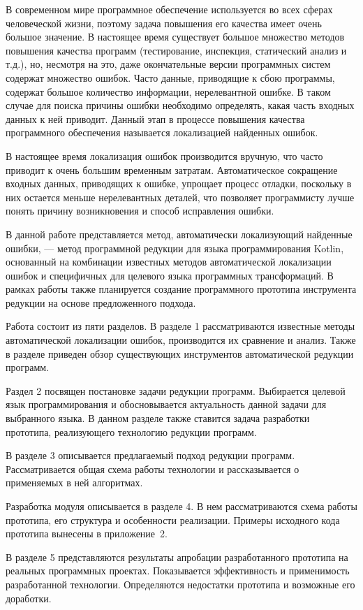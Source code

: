 \intro
В современном мире программное обеспечение используется во всех сферах человеческой жизни, поэтому задача повышения его качества имеет очень большое значение. В настоящее время существует большое множество методов повышения качества программ (тестирование, инспекция, статический анализ и т.д.), но, несмотря на это, даже окончательные версии программных систем содержат множество ошибок. Часто данные, приводящие к сбою программы, содержат большое количество информации, нерелевантной ошибке. В таком случае для поиска причины ошибки необходимо определять, какая часть входных данных к ней приводит. Данный этап в процессе повышения качества программного обеспечения называется локализацией найденных ошибок. 

В настоящее время локализация ошибок производится вручную, что часто приводит к очень большим временным затратам. Автоматическое сокращение входных данных, приводящих к ошибке, упрощает процесс отладки, поскольку в них остается меньше нерелевантных деталей, что позволяет программисту лучше понять причину возникновения и способ исправления ошибки.

В данной работе представляется метод, автоматически локализующий найденные ошибки, --- метод программной редукции для языка программирования Kotlin, основанный на комбинации известных методов автоматической локализации ошибок и специфичных для целевого языка программных трансформаций. В рамках работы также планируется создание программного прототипа инструмента редукции на основе предложенного подхода.

Работа состоит из пяти разделов. В разделе 1 рассматриваются известные методы автоматической локализации ошибок, производится их сравнение и анализ. Также в разделе приведен обзор существующих инструментов автоматической редукции программ.

Раздел 2 посвящен постановке задачи редукции программ. Выбирается целевой язык программирования и обосновывается актуальность данной задачи для выбранного языка. В данном разделе также ставится задача разработки прототипа, реализующего технологию редукции программ.

В разделе 3 описывается предлагаемый подход редукции программ. Рассматривается общая схема работы технологии и рассказывается о применяемых в ней алгоритмах.

Разработка модуля описывается в разделе 4. В нем рассматриваются схема работы прототипа, его структура и особенности реализации. Примеры исходного кода прототипа вынесены в приложение~2.

В разделе 5 представляются результаты апробации разработанного прототипа на реальных программных проектах. Показывается эффективность и применимость разработанной технологии. Определяются недостатки прототипа и возможные его доработки. 